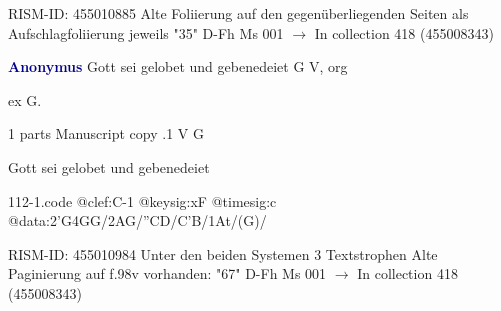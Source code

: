 \documentclass[twocolumn]{book}
\begin{document}
\newline RISM-ID: 455010885
\newline Alte Foliierung auf den gegenüberliegenden Seiten als Aufschlagfoliierung jeweils "35"
\newline D-Fh  Ms 001
\newline $\rightarrow$ In collection 418 (455008343)

\newline \par \vspace{7pt} \textcolor{darkblue}{\textbf{Anonymus  }}
\newline Gott sei gelobet und gebenedeiet  G  
\newline V, org
\newline \begin{itshape}[f.96r, at left:] ex G.\end{itshape} 
\newline \textcolor{darkblue}{}  1 parts  
\newline Manuscript copy
.1  V  G
\newline \begin{footnotesize} Gott sei gelobet und gebenedeiet \end{footnotesize}  
\begin{filecontents*}{112-1.code}
@clef:C-1
@keysig:xF
@timesig:c
@data:2'G4GG/2AG/''CD/C'B/1At/(G)/
\end{filecontents*}
\newline
%

\newline RISM-ID: 455010984
\newline Unter den beiden Systemen 3 Textstrophen
\newline Alte Paginierung auf f.98v vorhanden: "67"
\newline D-Fh  Ms 001
\newline $\rightarrow$ In collection 418 (455008343)
\end{document}
